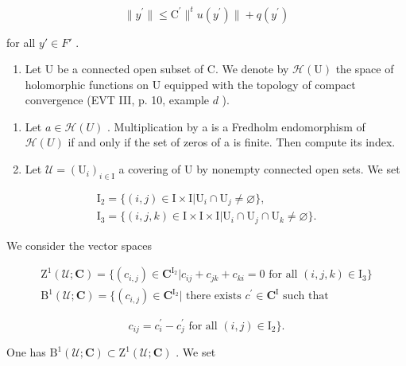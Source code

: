 \[
\| y ^ {\prime} \| \leqslant \mathrm{C} ^ {\prime} \| ^ {t} u (y ^ {\prime}) \| + q (y ^ {\prime})
\]

for all \(y' \in F'\) .

\begin{enumerate}
\def\labelenumi{\arabic{enumi})}
\setcounter{enumi}{7}
\tightlist
\item
  Let U be a connected open subset of C. We denote by \(\mathcal{H}(\mathrm{U})\) the space of holomorphic functions on U equipped with the topology of compact convergence (EVT III, p. 10, example \(d\) ).
\end{enumerate}

\begin{enumerate}
\def\labelenumi{\alph{enumi})}
\item
  Let \(a \in \mathcal{H}(U)\) . Multiplication by a is a Fredholm endomorphism of \(\mathcal{H}(U)\) if and only if the set of zeros of a is finite. Then compute its index.
\item
  Let \(\mathcal{U} = (\mathrm{U}_{i})_{i \in \mathrm{I}}\) a covering of U by nonempty connected open sets. We set
\end{enumerate}

\[
\begin{array}{l} \mathrm{I} _ {2} = \{(i, j) \in \mathrm{I} \times \mathrm{I} | \mathrm{U} _ {i} \cap \mathrm{U} _ {j} \neq \varnothing \}, \\ \mathrm{I} _ {3} = \{(i, j, k) \in \mathrm{I} \times \mathrm{I} \times \mathrm{I} | \mathrm{U} _ {i} \cap \mathrm{U} _ {j} \cap \mathrm{U} _ {k} \neq \varnothing \}. \end{array}
\]

We consider the vector spaces

\[
\begin{array}{l} \mathrm{Z} ^ {1} (\mathcal {U}; \mathbf {C}) = \{(c _ {i, j}) \in \mathbf {C} ^ {\mathrm{I} _ {2}} | c _ {i j} + c _ {j k} + c _ {k i} = 0 \text { for all } (i, j, k) \in \mathrm{I} _ {3} \} \\ \mathrm{B} ^ {1} (\mathcal {U}; \mathbf {C}) = \{(c _ {i, j}) \in \mathbf {C} ^ {\mathrm{I} _ {2}} | \text { there exists } c ^ {\prime} \in \mathbf {C} ^ {\mathrm{I}} \text { such that } \end{array}
\]

\[
c _ {i j} = c _ {i} ^ {\prime} - c _ {j} ^ {\prime} \text {   for all   } (i, j) \in \mathrm{I} _ {2} \}.
\]

One has \(\mathrm{B}^1 (\mathcal{U};\mathbf{C})\subset \mathrm{Z}^1 (\mathcal{U};\mathbf{C})\) . We set

